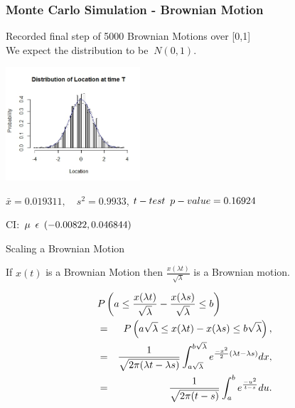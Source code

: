 \begin{frame}
   \frametitle{Monte Carlo Simulation - Brownian Motion}
	Recorded final step of 5000 Brownian Motions over [0,1]\\
	We expect the distribution to be $~N(0,1)$. \\
	\begin{center}
		\includegraphics[width=5cm]{img/bpath1montecarlohist}\\
	\end{center}
	\begin{center}
	$\bar{x}=0.019311,\hspace{1em} s^{2}=0.9933$,\hspace{1em} $t-test \hspace{.5em} p-value=0.16924$ 
	\end{center} 
	\centerline{CI:\hspace{1em}  $\mu\hspace{.5em}\epsilon \hspace{.5em}(-0.00822 , 0.046844)$}
\end{frame}


\begin{frame}{Scaling a Brownian Motion}
\vfill

If $x(t)$ is a Brownian Motion then 
$\displaystyle \frac{x(\lambda t)}{\sqrt{\lambda}}$ 
is a Brownian motion.
	
\vfill
\begin{eqnarray*}
  \lefteqn{
	P \left(a \leq \frac{x(\lambda t)}{\sqrt{\lambda}}-\frac{x(\lambda s)}{\sqrt{\lambda}} \leq b \right)
	} & & \\
    & = & P \left(a \sqrt{\lambda} \leq x(\lambda t) - x (\lambda s) \leq b \sqrt{\lambda} \right), \\
	& = & \displaystyle \frac{1}{\sqrt{2 \pi (\lambda t -\lambda s)}} 
                    \int_{a \sqrt{\lambda}}^{b \sqrt{\lambda}} e^{\frac{-x^2}{2}(\lambda t- \lambda s)} dx, \\
    & = & \frac{1}{\sqrt{2 \pi (t-s)}} \int_{a}^{b} e^{\frac{-u^2}{t-s}}du.
 \end{eqnarray*}
\end{frame}

